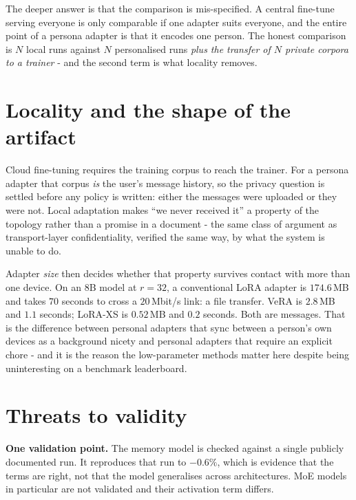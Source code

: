 \documentclass[conference]{IEEEtran}
\begin{document}
The deeper answer is that the comparison is mis-specified. A central fine-tune
serving everyone is only comparable if one adapter suits everyone, and the
entire point of a persona adapter is that it encodes one person. The honest
comparison is $N$ local runs against $N$ personalised runs \emph{plus the
transfer of $N$ private corpora to a trainer} - and the second term is what
locality removes.

\section{Locality and the shape of the artifact}
\label{sec:transport}

Cloud fine-tuning requires the training corpus to reach the trainer. For a
persona adapter that corpus \emph{is} the user's message history, so the privacy
question is settled before any policy is written: either the messages were
uploaded or they were not. Local adaptation makes ``we never received it'' a
property of the topology rather than a promise in a document - the same class of
argument as transport-layer confidentiality, verified the same way, by what the
system is unable to do.

Adapter \emph{size} then decides whether that property survives contact with
more than one device. On an 8B model at $r{=}32$, a conventional LoRA adapter is
$174.6$\,MB and takes $70$ seconds to cross a $20$\,Mbit/s link: a file
transfer. VeRA is $2.8$\,MB and $1.1$ seconds; LoRA-XS is $0.52$\,MB and
$0.2$ seconds. Both are messages. That is the difference between personal
adapters that sync between a person's own devices as a background nicety and
personal adapters that require an explicit chore - and it is the reason the
low-parameter methods matter here despite being uninteresting on a benchmark
leaderboard.

\section{Threats to validity}

\textbf{One validation point.} The memory model is checked against a single
publicly documented run. It reproduces that run to $-0.6\%$, which is evidence that the
terms are right, not that the model generalises across architectures. MoE
models in particular are not validated and their activation term differs.
\end{document}
